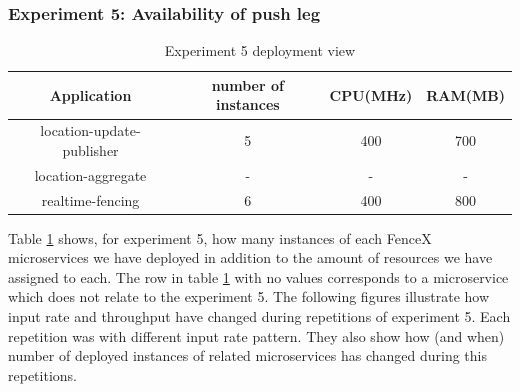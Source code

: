 \documentclass[a4]{report}
\begin{document}
    \subsubsection{Experiment 5: Availability of push leg}
    \begin{table}[h!]
        \centering
        \begin{tabular}{|c|c|c|c|}
            \hline
            Application               & number of instances & CPU(MHz) & RAM(MB) \\
            \hline
            location-update-publisher & 5                   & 400      & 700     \\
            location-aggregate        & -                   & -        & -       \\
            realtime-fencing          & 6                   & 400      & 800     \\
            \hline
        \end{tabular}
        \caption{Experiment 5 deployment view}
        \label{table:ex5-dv}
    \end{table}

    Table \ref{table:ex5-dv} shows, for experiment 5, how many instances of each FenceX microservices we have
    deployed in addition to the amount of resources we have assigned to each.
    The row in table \ref{table:ex5-dv} with no values corresponds to a microservice which does not relate to the
    experiment 5.
    The following figures illustrate how input rate and throughput have changed during repetitions of experiment 5.
    Each repetition was with different input rate pattern.
    They also show how (and when) number of deployed instances of related microservices has changed during this
    repetitions.
\end{document}
